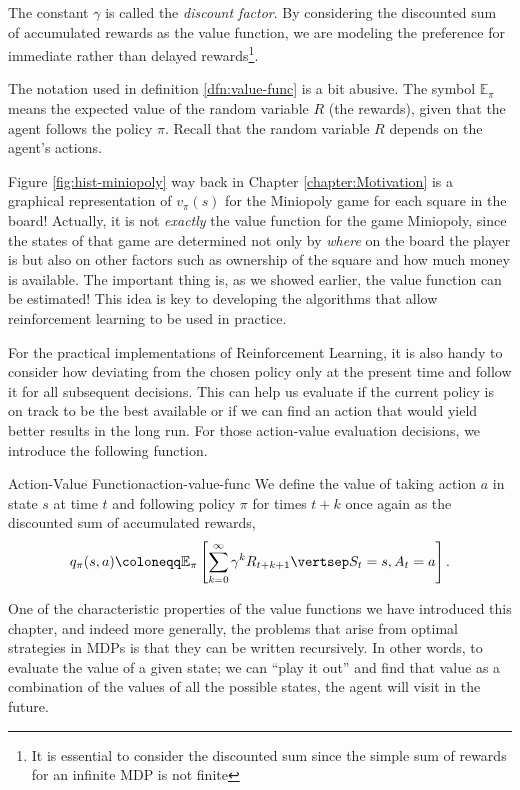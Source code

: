 The constant $\gamma$ is called the \textit{discount factor}. By considering the
discounted sum of accumulated rewards as the value function, we are modeling the
preference for immediate rather than delayed rewards\footnote{It is essential to
consider the discounted sum since the simple sum of rewards for an infinite MDP
is not finite}. 

The notation used in definition \ref{dfn:value-func} is a bit abusive. The
symbol $\mathbb{E}_{\pi}$ means the expected value of the random variable $R$
(the rewards), given that the agent follows the policy $\pi$. Recall that the
random variable $R$ depends on the agent's actions.

Figure \ref{fig:hist-miniopoly} way back in Chapter \ref{chapter:Motivation} is
a graphical representation of $v_\pi (s)$ for the Miniopoly game for each square
in the board! Actually, it is not \textit{exactly} the value function for the
game Miniopoly, since the states of that game are determined not only by
\textit{where} on the board the player is but also on other factors such as
ownership of the square and how much money is available. The important thing is,
as we showed earlier, the value function can be estimated! This idea is key to
developing the algorithms that allow reinforcement learning to be used in
practice.

For the practical implementations of Reinforcement Learning, it is also handy to
consider how deviating from the chosen policy only at the present time and
follow it for all subsequent decisions. This can help us evaluate if the current
policy is on track to be the best available or if we can find an action that
would yield better results in the long run. For those action-value evaluation
decisions, we introduce the following function.

\begin{dfn}{Action-Value Function}{action-value-func}
	We define the value of taking action $a$ in state $s$ at time $t$ and
	following policy $\pi$ for times $t+k$ once again as the discounted sum of
	accumulated rewards,
	\begin{equation*}
		q_\pi (s, a) \coloneqq \mathbb{E}_{\pi} \left[ \sum_{k=0}^{\infty} \gamma^{k} R_{t+k+1} \vertsep S_t = s, A_t = a \right].
	\end{equation*}
\end{dfn}

One of the characteristic properties of the value functions we have introduced
this chapter, and indeed more generally, the problems that arise from optimal
strategies in MDPs is that they can be written recursively. In other words, to
evaluate the value of a given state; we can ``play it out'' and find that value
as a combination of the values of all the possible states, the agent will visit in
the future.


